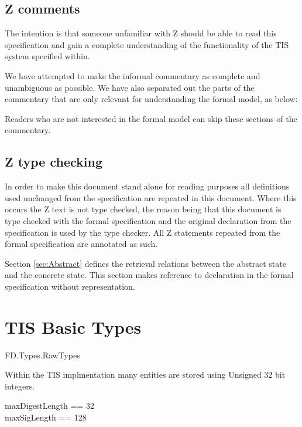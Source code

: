 \subsection{Z comments}
The intention is that someone unfamiliar with Z should be able to read this
specification and gain a complete understanding of the functionality
of the TIS system specified within.

We have attempted to make the informal commentary as complete and
unambiguous as possible. We have also separated out the parts of the
commentary that are only relevant for understanding the formal model,
as below:
\begin{Zcomment}
\item
Readers who are not interested in the formal model can skip these
sections of the commentary.
\end{Zcomment}

\subsection{Z type checking}
In order to make this document stand alone for reading purposes all
definitions used unchanged from the specification are repeated in this
document. Where this occurs the Z text is not type checked, the reason
being that this document is type checked with the formal
specification and the original declaration from the specification is
used by the type checker.
All Z statements repeated from the formal specification are annotated
as such.

Section \ref{sec:Abstract} defines the retrieval relations between the
abstract state and the concrete state. This section makes reference to
declaration in the formal specification \cite{FS} without
representation.
\section{TIS Basic Types}

\begin{traceunit}{FD.Types.RawTypes}
\end{traceunit}

Within the TIS implmentation many entities are stored using Unsigned 32
bit integers.
\begin{zed}
        maxDigestLength == 32
\\      maxSigLength == 128
\end{zed}

